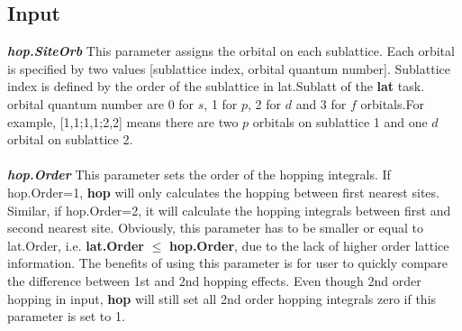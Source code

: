 \documentclass[10pt,a4paper]{article}
\begin{document}
\subsection{Input}
\textit{\textbf{hop.SiteOrb}} This parameter assigns the orbital on each sublattice. Each orbital is specified by two values [sublattice index, orbital quantum number]. Sublattice index is defined by the order of the sublattice in lat.Sublatt of the \textbf{lat} task. orbital quantum number are 0 for $s$, 1 for $p$, 2 for $d$ and 3 for $f$ orbitals.For example, [1,1;1,1;2,2] means there are two $p$ orbitals on sublattice 1 and one $d$ orbital on sublattice 2. \\ \\ 
\textit{\textbf{hop.Order}} This parameter sets the order of the hopping integrals. If hop.Order=1, \textbf{hop} will only calculates the hopping between first nearest sites. Similar, if hop.Order=2, it will calculate the hopping integrals between first and second nearest site. Obviously, this parameter has to be smaller or equal to lat.Order, i.e. \textbf{lat.Order} $\leq$ \textbf{hop.Order}, due to the lack of higher order lattice information. The benefits of using this parameter is for user to quickly compare the difference between 1st and 2nd hopping effects. Even though 2nd order hopping in input, \textbf{hop} will still set all 2nd order hopping integrals zero if this parameter is set to 1.\\ \\
\end{document}
